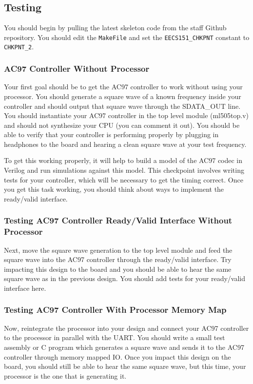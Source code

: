 \documentclass[11pt]{article}
\begin{document}
\subsection{Testing}
You should begin by pulling the latest skeleton code from the staff Github repository. You should edit the \verb|MakeFile| and set the \verb|EECS151_CHKPNT| constant to \verb|CHKPNT_2|.

\subsubsection{AC97 Controller Without Processor}
Your first goal should be to get the AC97 controller to work without using your processor. You should generate a square wave of a known frequency inside your controller and should output that square wave through the SDATA\_OUT line. You should instantiate your AC97 controller in the top level module (ml505top.v) and should not synthesize your CPU (you can comment it out). You should be able to verify that your controller is performing properly by plugging in headphones to the board and hearing a clean square wave at your test frequency.

To get this working properly, it will help to build a model of the AC97 codec in Verilog and run simulations against this model. This checkpoint involves writing tests for your controller, which will be necessary to get the timing correct. Once you get this task working, you should think about ways to implement the ready/valid interface.

\subsubsection{Testing AC97 Controller Ready/Valid Interface Without Processor}
Next, move the square wave generation to the top level module and feed the square wave into the AC97 controller through the ready/valid interface. Try impacting this design to the board and you should be able to hear the same square wave as in the previous design. You should add tests for your ready/valid interface here.

\subsubsection{Testing AC97 Controller With Processor Memory Map}
Now, reintegrate the processor into your design and connect your AC97 controller to the processor in parallel with the UART. You should write a small test assembly or C program which generates a square wave and sends it to the AC97 controller through memory mapped IO. Once you impact this design on the board, you should still be able to hear the same square wave, but this time, your processor is the one that is generating it.
\end{document}
